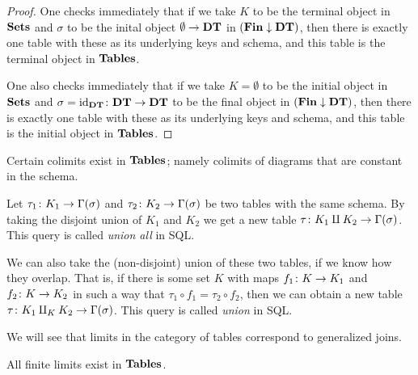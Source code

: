 \documentclass{amsart}
\def\DT{{\bf DT}}
\def\Tables{{\bf Tables}}
\def\Fin{{\bf Fin}}
\begin{document}
\begin{proof}

One checks immediately that if we take $K$ to be the terminal object in ${\bf Sets}$ and $\sigma$ to be the inital object $\emptyset\to\DT$ in $(\Fin\down\DT)$, then there is exactly one table with these as its underlying keys and schema, and this table is the terminal object in $\Tables$.

One also checks immediately that if we take $K=\emptyset$ to be the initial object in ${\bf Sets}$ and $\sigma=\id_{\DT}\taking\DT\to\DT$ to be the final object in $(\Fin\down\DT)$, then there is exactly one table with these as its underlying keys and schema, and this table is the initial object in $\Tables$.

\end{proof}

Certain colimits exist in $\Tables$; namely colimits of diagrams that are constant in the schema.

\begin{construction}

Let $\tau_1\colon K_1\rightarrow\Gamma(\sigma)$ and $\tau_2\colon K_2\rightarrow\Gamma(\sigma)$ be two tables with the same schema.  By taking the disjoint union of $K_1$ and $K_2$ we get a new table $\tau\colon K_1\amalg K_2\rightarrow\Gamma(\sigma)$.  This query is called {\em union all} in SQL.  

We can also take the (non-disjoint) union of these two tables, if we know how they overlap.  That is, if there is some set $K$ with maps $f_1\colon K\rightarrow K_1$ and $f_2\colon K\rightarrow K_2$ in such a way that $\tau_1\circ f_1=\tau_2\circ f_2$, then we can obtain a new table $\tau\colon K_1\amalg_KK_2\rightarrow\Gamma(\sigma)$.  This query is called {\em union} in SQL.

\end{construction}

We will see that limits in the category of tables correspond to generalized joins.

\begin{proposition}\label{finite limits exist}

All finite limits exist in $\Tables$.

\end{proposition}
\end{document}
